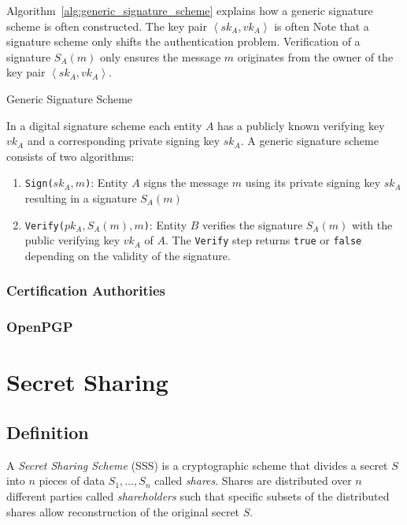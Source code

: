 Algorithm~\ref{alg:generic_signature_scheme} explains how a generic signature scheme is often constructed. The key pair $\left< sk_A, vk_A \right>$ is often  Note that a signature scheme only shifts the authentication problem. Verification of a signature $S_A \left( m \right)$ only ensures the message $m$ originates from the owner of the key pair $\left< sk_A, vk_A \right>$.
\begin{algorithm}
\caption{Generic Signature Scheme }
\label{alg:generic_signature_scheme}
 In a digital signature scheme each entity $A$ has a publicly known verifying key $vk_A$ and a corresponding private signing key $sk_A$. A generic signature scheme consists of two algorithms:
 \begin{enumerate}
  \item \texttt{Sign($sk_A, m$)}: Entity $A$ signs the message $m$ using its private signing key $sk_A$ resulting in a signature $S_A \left( m \right)$
  \item \texttt{Verify($pk_A, S_A \left( m \right), m$)}: Entity $B$ verifies the signature $S_A \left( m \right)$ with the public verifying key $vk_A$ of $A$. The \texttt{Verify} step returns \texttt{true} or \texttt{false} depending on the validity of the signature.
 \end{enumerate}
\end{algorithm}


\subsubsection{Certification Authorities} 

\subsubsection{OpenPGP}

\section{Secret Sharing}

\subsection{Definition}
\begin{defn}[SSS]
\label{def:secret_sharing_scheme}
 A \textit{Secret Sharing Scheme} (SSS) is a cryptographic scheme that divides a secret $S$ into $n$ pieces of data $S_1, \ldots, S_n$ called \textit{shares}. Shares are distributed over $n$ different parties called \textit{shareholders} such that specific subsets of the distributed shares allow reconstruction of the original secret $S$.
\end{defn}

